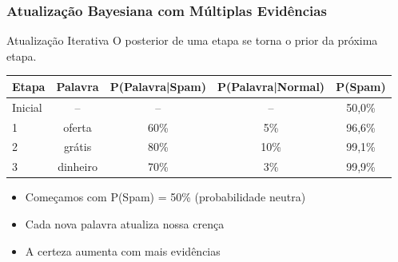 \documentclass[11pt]{beamer}
\begin{document}
\begin{frame}
\frametitle{Atualização Bayesiana com Múltiplas Evidências}
\begin{block}{Atualização Iterativa}
O posterior de uma etapa se torna o prior da próxima etapa.
\end{block}

\begin{center}
\footnotesize
\begin{tabular}{|l|c|c|c|c|}
\hline
\textbf{Etapa} & \textbf{Palavra} & \textbf{P(Palavra|Spam)} & \textbf{P(Palavra|Normal)} & \textbf{P(Spam)} \\
\hline
Inicial & -- & -- & -- & 50,0\% \\
\hline
1 & oferta & 60\% & 5\% & 96,6\% \\
\hline
2 & grátis & 80\% & 10\% & 99,1\% \\
\hline
3 & dinheiro & 70\% & 3\% & 99,9\% \\
\hline
\end{tabular}
\end{center}

\begin{itemize}
\item Começamos com P(Spam) = 50\% (probabilidade neutra)
\item Cada nova palavra atualiza nossa crença
\item A certeza aumenta com mais evidências
\end{itemize}
\end{frame}
\end{document}
